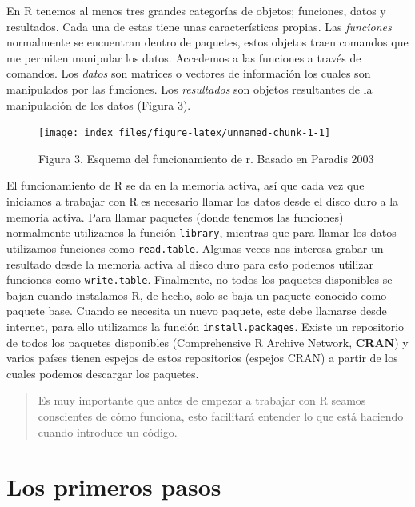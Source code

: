 \documentclass[]{article}
\begin{document}
En R tenemos al menos tres grandes categorías de objetos; funciones,
datos y resultados. Cada una de estas tiene unas características
propias. Las \emph{funciones} normalmente se encuentran dentro de
paquetes, estos objetos traen comandos que me permiten manipular los
datos. Accedemos a las funciones a través de comandos. Los \emph{datos}
son matrices o vectores de información los cuales son manipulados por
las funciones. Los \emph{resultados} son objetos resultantes de la
manipulación de los datos (Figura 3).

\begin{figure}

{\centering \texttt{[image: index\_files/figure-latex/unnamed-chunk-1-1]} 

}

\caption{Figura 3. Esquema del funcionamiento de r. Basado en Paradis 2003}\label{fig:unnamed-chunk-1}
\end{figure}

El funcionamiento de R se da en la memoria activa, así que cada vez que
iniciamos a trabajar con R es necesario llamar los datos desde el disco
duro a la memoria activa. Para llamar paquetes (donde tenemos las
funciones) normalmente utilizamos la función \texttt{library}, mientras
que para llamar los datos utilizamos funciones como \texttt{read.table}.
Algunas veces nos interesa grabar un resultado desde la memoria activa
al disco duro para esto podemos utilizar funciones como
\texttt{write.table}. Finalmente, no todos los paquetes disponibles se
bajan cuando instalamos R, de hecho, solo se baja un paquete conocido
como paquete base. Cuando se necesita un nuevo paquete, este debe
llamarse desde internet, para ello utilizamos la función
\texttt{install.packages}. Existe un repositorio de todos los paquetes
disponibles (Comprehensive R Archive Network, \textbf{CRAN}) y varios
países tienen espejos de estos repositorios (espejos CRAN) a partir de
los cuales podemos descargar los paquetes.

\begin{quote}
Es muy importante que antes de empezar a trabajar con R seamos
conscientes de cómo funciona, esto facilitará entender lo que está
haciendo cuando introduce un código.
\end{quote}

\section{Los primeros pasos}\label{los-primeros-pasos}
\end{document}
